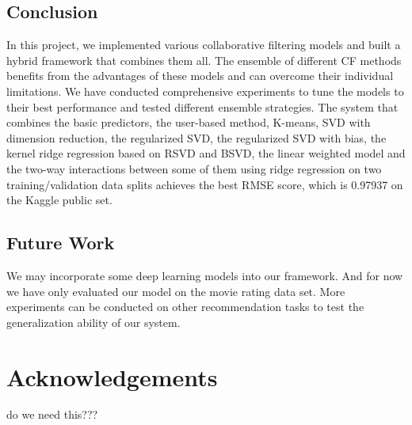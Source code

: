 \documentclass[10pt,conference,compsocconf]{IEEEtran}
\begin{document}
\subsection{Conclusion}
In this project, we implemented various collaborative filtering models and built a hybrid framework that combines them all. The ensemble of different CF methods benefits from the advantages of these models and can overcome their individual limitations. We have conducted comprehensive experiments to tune the models to their best performance and tested different ensemble strategies. The system that combines the basic predictors, the user-based method, K-means, SVD with dimension reduction, the regularized SVD, the regularized SVD with bias, the kernel ridge regression based on RSVD and BSVD, the linear weighted model and the two-way interactions between some of them using ridge regression on two training/validation data splits achieves the best RMSE score, which is 0.97937 on the Kaggle public set.

\subsection{Future Work}
We may incorporate some deep learning models into our framework. And for now we have only evaluated our model on the movie rating data set. More experiments can be conducted on other recommendation tasks to test the generalization ability of our system.

\section*{Acknowledgements}
do we need this???



\end{document}
